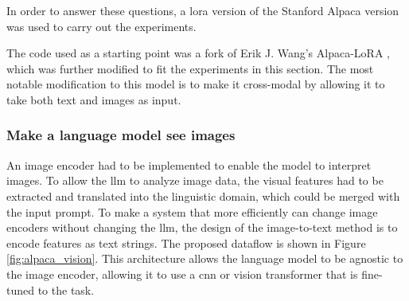         In order to answer these questions, a \gls{lora} version of the Stanford Alpaca version was used to carry out the experiments. 
        
        The code used as a starting point was a fork of Erik J. Wang's Alpaca-LoRA \cite{wangAlpacaLoRA2023}, which was further modified to fit the experiments in this section. 
        The most notable modification to this model is to make it cross-modal by allowing it to take both text and images as input.


        

        \subsubsection{Make a language model see images}
        An image encoder had to be implemented to enable the model to interpret images. To allow the \gls{llm} to analyze image data, the visual features had to be extracted and translated into the linguistic domain, which could be merged with the input prompt. 
        To make a system that more efficiently can change image encoders without changing the \gls{llm}, the design of the image-to-text method is to encode features as text strings.
        The proposed dataflow is shown in Figure \ref{fig:alpaca_vision}. This architecture allows the language model to be agnostic to the image encoder, allowing it to use a \gls{cnn} or vision transformer that is fine-tuned to the task.

